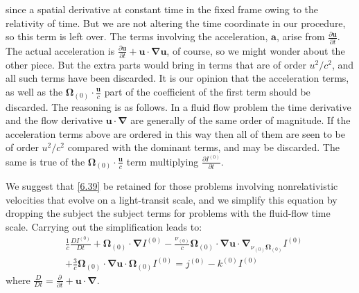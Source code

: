 \documentclass[letterpaper]{report}
\newcommand\bn{\boldsymbol{\nabla}}
\newcommand\bo{\boldsymbol{\Omega}}
\newcommand\bs{\boldsymbol}
\renewcommand{\(}{\left(}
\renewcommand{\)}{\right)}
\renewcommand{\[}{\left[}
\renewcommand{\]}{\right]}
\begin{document}
since a spatial derivative at constant time in the fixed frame owing to the
relativity of time. But we are not altering the time coordinate in our
procedure, so this term is left over. The terms involving the acceleration,
$\bs{a}$, arise from $\frac{\partial \bs{u}}{\partial t}$. The actual
acceleration is $\frac{\partial \bs{u}}{\partial t} + \bs{u}\cdot\bn\bs{u}$,
of course, so we might wonder about the other piece. But the extra parts would
bring in terms that are of order $u^2/c^2$, and all such terms have been
discarded. It is our opinion that the acceleration terms, as well as the
$\bo_{(0)}\cdot \frac{\bs{u}}{c}$ part of the coefficient of the first term
should be discarded. The reasoning is as follows. In a fluid flow problem the
time derivative and the flow derivative $\bs{u}\cdot\bn$ are generally of the
same order of magnitude. If the acceleration terms above are ordered in this
way then all of them are seen to be of order $u^2/c^2$ compared with the
dominant terms, and may be discarded. The same is true of the
$\bo_{(0)}\cdot\frac{\bs{u}}{c}$ term multiplying $\frac{\partial
I^{(0)}}{\partial t}$.

We suggest that \cref{6.39} be retained for those problems involving
nonrelativistic velocities that evolve on a light-transit scale, and we
simplify this equation by dropping the subject the subject terms for problems
with the fluid-flow time scale. Carrying out the simplification leads to:
\begin{equation}
  \begin{split}
    &\frac{1}{c}\frac{D I^{(0)}}{Dt} +\bo_{(0)}\cdot\bn
    I^{(0)}-\frac{\nu_{(0)}}{c}\bo_{(0)}\cdot\bn\bs{u}\cdot
    \bn_{\nu_{(0)}\bo_{(0)}}I^{(0)}\\
    &+\frac{3}{c}\bo_{(0)}\cdot\bn\bs{u}\cdot\bo_{(0)}I^{(0)} =
    j^{(0)}-k^{(0)}I^{(0)}
  \end{split}
\end{equation}
where $\frac{D}{Dt}=\frac{\partial}{\partial t}+\bs{u}\cdot\bn$.
\end{document}
